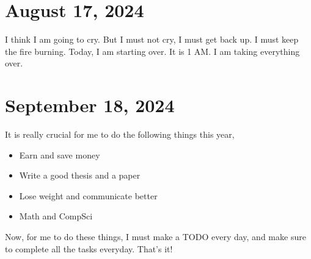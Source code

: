 \section{August 17, 2024}
\noindent I think I am going to cry. But I must not cry, I must get back up. I must keep the fire burning.
Today, I am starting over. It is 1 AM. I am taking everything over.

\section{September 18, 2024}
\noindent It is really crucial for me to do the following things this year,

\begin{itemize}
	\item Earn and save money
	\item Write a good thesis and a paper
	\item Lose weight and communicate better
	\item Math and CompSci
\end{itemize}

\noindent Now, for me to do these things, I must make a TODO every day, and make sure to complete 
all the tasks everyday. That's it!


